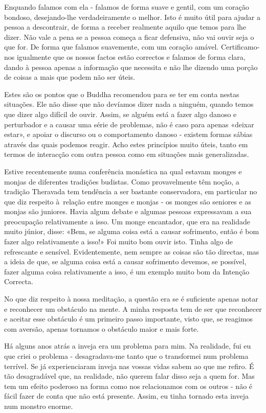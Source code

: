 Enquando falamos com ela - falamos de forma suave e gentil, com um
coração bondoso, desejando-lhe verdadeiramente o melhor. Isto é muito
útil para ajudar a pessoa a descontrair, de forma a receber realmente
aquilo que temos para lhe dizer. Não vale a pena se a pessoa começa a
ficar defensiva, não vai ouvir seja o que for. De forma que falamos
suavemente, com um coração amável. Certificamo-nos igualmente que os
nossos factos estão correctos e falamos de forma clara, dando à pessoa
apenas a informação que necessita e não lhe dizendo uma porção de coisas
a mais que podem não ser úteis.

Estes são os pontos que o Buddha recomendou para se ter em conta nestas
situações. Ele não disse que não devíamos dizer nada a ninguém, quando
temos que dizer algo difícil de ouvir. Assim, se alguém está a fazer
algo danoso e perturbador e a causar uma série de problemas, não é caso
para apenas «deixar estar», e apoiar o discurso ou o comportamento
danoso - existem formas sábias através das quais podemos reagir. Acho
estes princípios muito úteis, tanto em termos de interacção com outra
pessoa como em situações mais generalizadas.

Estive recentemente numa conferência monástica na qual estavam monges e
monjas de diferentes tradições budistas. Como provavelmente têm noção, a
tradição Theravada tem tendência a ser bastante conservadora, em
particular no que diz respeito à~\mbox{relação} entre monges e monjas - os
monges são seniores e as monjas são juniores. Havia algum debate e
algumas pessoas expressavam a sua preocupação relativamente a isso. Um
monge encantador, que era na realidade muito júnior, disse: «Bem, se
alguma coisa está a causar sofrimento, então é bom fazer algo
relativamente a isso!» Foi muito bom ouvir isto. Tinha algo de
refrescante e sensível. Evidentemente, nem sempre as coisas são tão
directas, mas a ideia de que, se alguma coisa está a causar sofrimento
devemos, se possível, fazer alguma coisa relativamente a isso, é um
exemplo muito bom da Intenção Correcta.

No que diz respeito à nossa meditação, a questão era se é suficiente
apenas notar e reconhecer um obstáculo na mente. A minha resposta tem de
ser que reconhecer e aceitar esse obstáculo é um primeiro passo
importante, visto que, se reagimos com aversão, apenas tornamos o
obstáculo maior e mais forte.

Há alguns anos atrás a inveja era um problema para mim. Na realidade,
fui eu que criei o problema - desagradava-me tanto que o transformei num
problema terrível. Se já experienciaram inveja nas vossas vidas sabem ao
que me refiro. É tão desagradável que, na realidade, não querem falar
disso seja a quem for. Mas tem um efeito poderoso na forma como nos
relacionamos com os outros - não é fácil fazer de conta que não está
presente. Assim, eu tinha tornado esta inveja num monstro enorme.

